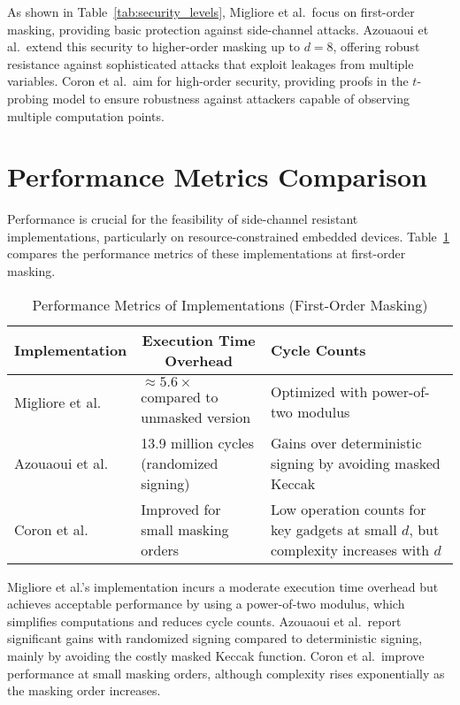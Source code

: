 As shown in Table~\ref{tab:security_levels}, Migliore et al.\ focus on first-order masking, providing basic protection against side-channel attacks. Azouaoui et al.\ extend this security to higher-order masking up to $d=8$, offering robust resistance against sophisticated attacks that exploit leakages from multiple variables. Coron et al.\ aim for high-order security, providing proofs in the $t$-probing model to ensure robustness against attackers capable of observing multiple computation points.

\section{Performance Metrics Comparison}

Performance is crucial for the feasibility of side-channel resistant implementations, particularly on resource-constrained embedded devices. Table~\ref{tab:performance_metrics} compares the performance metrics of these implementations at first-order masking.

\begin{table}[h]
    \centering
    \renewcommand{\arraystretch}{1.2} %
    \caption{Performance Metrics of Implementations (First-Order Masking)}
    \begin{tabular}{l | p{5cm} | p{6cm}} %
        \toprule
        \textbf{Implementation}            & \multicolumn{1}{c|}{\textbf{Execution Time Overhead}} & \textbf{Cycle Counts}                                                                \\
        \midrule
        Migliore et al.\ \cite{Migliore19} & $\approx 5.6\times$ compared to unmasked version      & Optimized with power-of-two modulus                                                  \\
        Azouaoui et al.\ \cite{Azouaoui22} & 13.9 million cycles (randomized signing)              & Gains over deterministic signing by avoiding masked Keccak                           \\
        Coron et al.\ \cite{Coron23}       & Improved for small masking orders                     & Low operation counts for key gadgets at small $d$, but complexity increases with $d$ \\
        \bottomrule
    \end{tabular}
    \label{tab:performance_metrics}
\end{table}



Migliore et al.'s implementation incurs a moderate execution time overhead but achieves acceptable performance by using a power-of-two modulus, which simplifies computations and reduces cycle counts. Azouaoui et al.\ report significant gains with randomized signing compared to deterministic signing, mainly by avoiding the costly masked Keccak function. Coron et al.\ improve performance at small masking orders, although complexity rises exponentially as the masking order increases.

